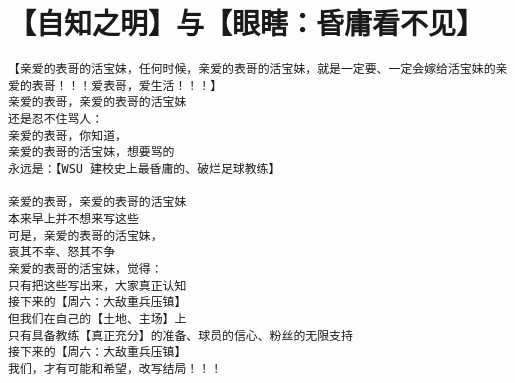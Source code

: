 \documentclass[9pt, b5paper]{article}
\begin{document}
\section{【自知之明】与【眼瞎：昏庸看不见】}
\label{sec-14}
\begin{verbatim}
【亲爱的表哥的活宝妹，任何时候，亲爱的表哥的活宝妹，就是一定要、一定会嫁给活宝妹的亲爱的表哥！！！爱表哥，爱生活！！！】
亲爱的表哥，亲爱的表哥的活宝妹
还是忍不住骂人：
亲爱的表哥，你知道，
亲爱的表哥的活宝妹，想要骂的
永远是：【WSU 建校史上最昏庸的、破烂足球教练】

亲爱的表哥，亲爱的表哥的活宝妹 
本来早上并不想来写这些
可是，亲爱的表哥的活宝妹，
哀其不幸、怒其不争
亲爱的表哥的活宝妹，觉得：
只有把这些写出来，大家真正认知
接下来的【周六：大敌重兵压镇】
但我们在自己的【土地、主场】上
只有具备教练【真正充分】的准备、球员的信心、粉丝的无限支持
接下来的【周六：大敌重兵压镇】
我们，才有可能和希望，改写结局！！！


\end{verbatim}
\end{document}
